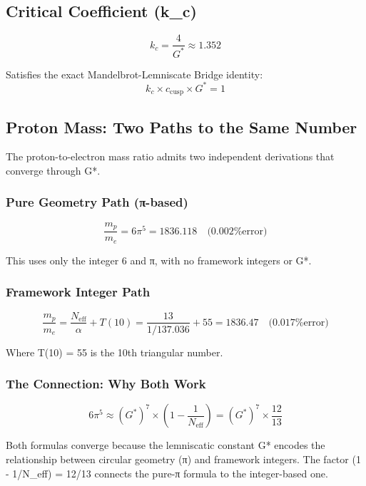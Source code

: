 \documentclass[
  11pt,
  letterpaper,
  twoside,
  openany]{book}
\makeatletter
\let\orig@subsection\subsection
\renewcommand{\subsection}{\needspace{6\baselineskip}\orig@subsection}
\let\orig@subsubsection\subsubsection
\renewcommand{\subsubsection}{\needspace{5\baselineskip}\orig@subsubsection}
\makeatother
\begin{document}
\subsection{Critical Coefficient (k\_c)}\label{critical-coefficient-k_c}

\[
k_c = \frac{4}{G^*} \approx 1.352
\]

Satisfies the exact Mandelbrot-Lemniscate Bridge identity:
\[k_c \times c_{\text{cusp}} \times G^* = 1\]

\subsection{Proton Mass: Two Paths to the Same
Number}\label{proton-mass-two-paths-to-the-same-number}

The proton-to-electron mass ratio admits two independent derivations
that converge through G*.

\subsubsection{Pure Geometry Path
(π-based)}\label{pure-geometry-path-ux3c0-based}

\[
\frac{m_p}{m_e} = 6\pi^5 = 1836.118 \quad \text{(0.002\% error)}
\]

This uses only the integer 6 and π, with no framework integers or G*.

\subsubsection{Framework Integer Path}\label{framework-integer-path}

\[
\frac{m_p}{m_e} = \frac{N_{\text{eff}}}{\alpha} + T(10) = \frac{13}{1/137.036} + 55 = 1836.47 \quad \text{(0.017\% error)}
\]

Where T(10) = 55 is the 10th triangular number.

\subsubsection{The Connection: Why Both
Work}\label{the-connection-why-both-work}

\[
6\pi^5 \approx (G^*)^7 \times \left(1 - \frac{1}{N_{\text{eff}}}\right) = (G^*)^7 \times \frac{12}{13}
\]

Both formulas converge because the lemniscatic constant G* encodes the
relationship between circular geometry (π) and framework integers. The
factor (1 - 1/N\_eff) = 12/13 connects the pure-π formula to the
integer-based one.
\end{document}
